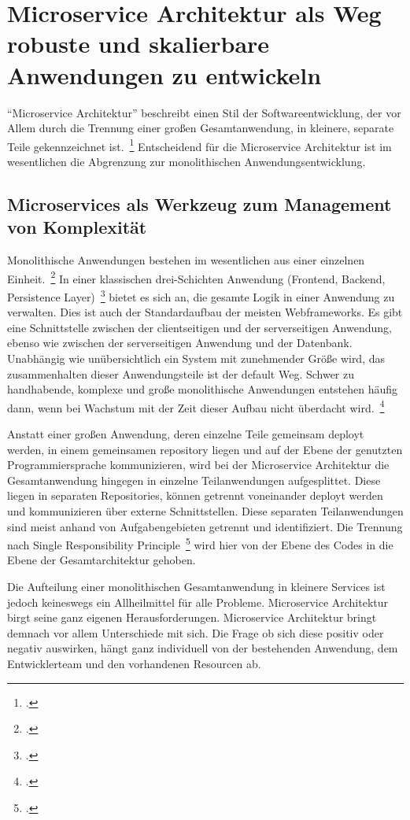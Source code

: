 \chapter{Microservice Architektur als Weg robuste und skalierbare Anwendungen zu entwickeln}
``Microservice Architektur'' beschreibt einen Stil der Softwareentwicklung, der vor Allem durch die Trennung einer großen Gesamtanwendung, in kleinere, separate Teile gekennzeichnet ist.~\footcite[vgl.][Seite 2]{newman2015building}
Entscheidend für die Microservice Architektur ist im wesentlichen die Abgrenzung zur monolithischen Anwendungsentwicklung.

\section{Microservices als Werkzeug zum Management von Komplexität}
Monolithische Anwendungen bestehen im wesentlichen aus einer einzelnen Einheit.~\footcite[vgl.][]{Fowler:Intro} In einer klassischen drei-Schichten Anwendung (Frontend, Backend, Persistence Layer)~\footcite[vgl.][]{MSDN:TTA} bietet es sich an, die gesamte Logik in einer Anwendung zu verwalten. Dies ist auch der Standardaufbau der meisten Webframeworks. Es gibt eine Schnittstelle zwischen der clientseitigen und der serverseitigen Anwendung, ebenso wie zwischen der serverseitigen Anwendung und der Datenbank. Unabhängig wie unübersichtlich ein System mit zunehmender Größe wird, das zusammenhalten dieser Anwendungsteile ist der default Weg. Schwer zu handhabende, komplexe und große monolithische Anwendungen entstehen häufig dann, wenn bei Wachstum mit der Zeit dieser Aufbau nicht überdacht wird.~\footcite[vgl.][]{infaktuell}

Anstatt einer großen Anwendung, deren einzelne Teile gemeinsam deployt werden, in einem gemeinsamen repository liegen und auf der Ebene der genutzten Programmiersprache kommunizieren, wird bei der Microservice Architektur die Gesamtanwendung hingegen in einzelne Teilanwendungen aufgesplittet. Diese liegen in separaten Repositories, können getrennt voneinander deployt werden und kommunizieren über externe Schnittstellen. Diese separaten Teilanwendungen sind meist anhand von Aufgabengebieten getrennt und identifiziert. Die Trennung nach Single Responsibility Principle~\footcite[vgl.][Seite 108]{Martin:SRP} wird hier von der Ebene des Codes in die Ebene der Gesamtarchitektur gehoben.

Die Aufteilung einer monolithischen Gesamtanwendung in kleinere Services ist jedoch keineswegs ein Allheilmittel für alle Probleme. Microservice Architektur birgt seine ganz eigenen Herausforderungen. Microservice Architektur bringt demnach vor allem Unterschiede mit sich. Die Frage ob sich diese positiv oder negativ auswirken, hängt ganz individuell von der bestehenden Anwendung, dem Entwicklerteam und den vorhandenen Resourcen ab.


